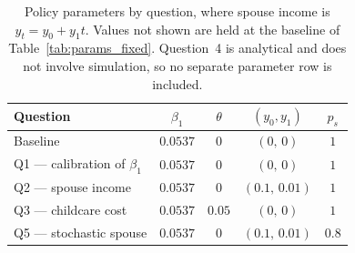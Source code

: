 \begin{table}[H]
\centering
\begin{tabular}{lcccc}
\hline
Question & $\beta_1$ & $\theta$ & $(y_0,y_1)$ & $p_s$ \\
\hline
Baseline                       & $0.0537$ & $0$    & $(0,\,0)$       & $1$ \\
Q1 — calibration of $\beta_1$  & $0.0537$ & $0$    & $(0,\,0)$       & $1$ \\
Q2 — spouse income             & $0.0537$ & $0$    & $(0.1,\,0.01)$  & $1$ \\
Q3 — childcare cost            & $0.0537$ & $0.05$ & $(0,\,0)$       & $1$ \\
Q5 — stochastic spouse         & $0.0537$ & $0$    & $(0.1,\,0.01)$  & $0.8$ \\
\hline
\end{tabular}
\caption{Policy parameters by question, where spouse income is $y_t = y_0 + y_1 t$. Values not shown are held at the baseline of Table~\ref{tab:params_fixed}. Question~4 is analytical and does not involve simulation, so no separate parameter row is included.}
\label{tab:params_policy}
\end{table}
